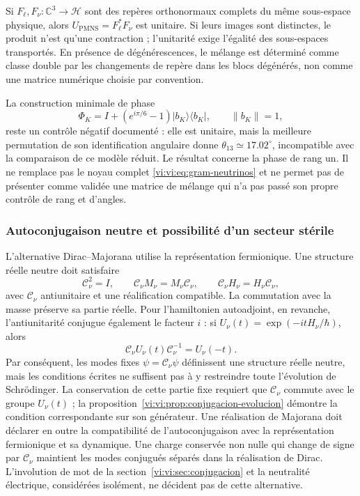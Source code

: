 Si \(F_\ell,F_\nu:\mathbb C^3\to\mathcal H\) sont des repères orthonormaux
complets du même sous-espace physique, alors
\(U_{\mathrm{PMNS}}=F_\ell^*F_\nu\) est unitaire. Si leurs images sont
distinctes, le produit n’est qu’une contraction ; l’unitarité exige
l’égalité des sous-espaces transportés. En présence de dégénérescences,
le mélange est déterminé comme classe double par les changements de repère dans
les blocs dégénérés, non comme une matrice numérique choisie par convention.

La construction minimale de phase
\[
 \Phi_K=I+(e^{i\pi/6}-1)|b_K\rangle\langle b_K|,
 \qquad\|b_K\|=1,
\]
reste un contrôle négatif documenté : elle est unitaire, mais la meilleure
permutation de son identification angulaire donne
\(\theta_{13}\simeq17.02^\circ\), incompatible avec la comparaison de ce
modèle réduit. Le résultat concerne la phase de rang un. Il ne
remplace pas le noyau complet \eqref{vi:vi:eq:gram-neutrinos} et ne permet pas de
présenter comme validée une matrice de mélange qui n’a pas passé son propre
contrôle de rang et d’angles.

\subsubsection{Autoconjugaison neutre et possibilité d’un secteur stérile}

L’alternative Dirac--Majorana utilise la représentation fermionique. Une
structure réelle neutre doit satisfaire
\[
 \mathcal C_\nu^2=I,\qquad
 \mathcal C_\nu M_\nu=M_\nu\mathcal C_\nu,\qquad
 \mathcal C_\nu H_\nu=H_\nu\mathcal C_\nu,
\]
avec \(\mathcal C_\nu\) antiunitaire et une réalification compatible.
La commutation avec la masse préserve sa partie réelle. Pour l’hamiltonien
autoadjoint, en revanche, l’antiunitarité conjugue également le facteur
\(i\) : si \(U_\nu(t)=\exp(-itH_\nu/\hbar)\), alors
\[
 \mathcal C_\nu U_\nu(t)\mathcal C_\nu^{-1}=U_\nu(-t).
\]
Par conséquent, les modes fixes \(\psi=\mathcal C_\nu\psi\) définissent une
structure réelle neutre, mais les conditions écrites ne suffisent pas à
y restreindre toute l’évolution de Schr\"odinger. La conservation de
cette partie fixe requiert que \(\mathcal C_\nu\) commute avec le groupe
\(U_\nu(t)\) ; la proposition~\ref{vi:vi:prop:conjugacion-evolucion}
démontre la condition correspondante sur son générateur. Une
réalisation de Majorana doit déclarer en outre la compatibilité de
l’autoconjugaison avec la représentation fermionique et sa dynamique.
Une charge conservée non nulle qui change
de signe par \(\mathcal C_\nu\) maintient les modes conjugués séparés
dans la réalisation de Dirac. L’involution de mot de la
section~\ref{vi:vi:sec:conjugacion} et la neutralité électrique, considérées
isolément, ne décident pas de cette alternative.

